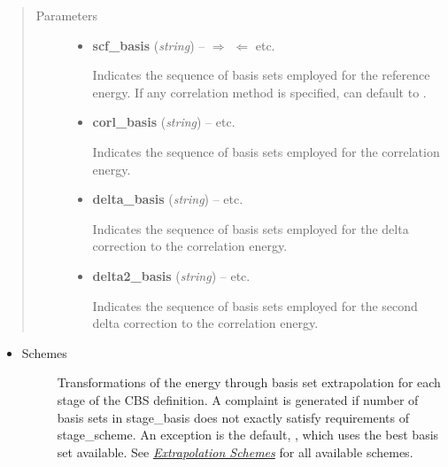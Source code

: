 \documentclass[letterpaper,10pt,english]{sphinxmanual}
\begin{document}
\begin{fulllineitems}
\begin{itemize}
\begin{description}
\end{description}

\end{itemize}
\begin{quote}\begin{description}
\item[{Parameters}] \leavevmode\begin{itemize}
\item {} 
\textbf{scf\_basis} (\emph{string}) -- 
$\Rightarrow$  $\Leftarrow$ \textbar{}\textbar{}  \textbar{}\textbar{}  \textbar{}\textbar{}  \textbar{}\textbar{} etc.

Indicates the sequence of basis sets employed for the reference energy.
If any correlation method is specified,  can default
to .


\item {} 
\textbf{corl\_basis} (\emph{string}) -- 
 \textbar{}\textbar{}  \textbar{}\textbar{}  \textbar{}\textbar{} etc.

Indicates the sequence of basis sets employed for the correlation energy.


\item {} 
\textbf{delta\_basis} (\emph{string}) -- 
 \textbar{}\textbar{}  \textbar{}\textbar{}  \textbar{}\textbar{} etc.

Indicates the sequence of basis sets employed for the delta correction
to the correlation energy.


\item {} 
\textbf{delta2\_basis} (\emph{string}) -- 
 \textbar{}\textbar{}  \textbar{}\textbar{}  \textbar{}\textbar{} etc.

Indicates the sequence of basis sets employed for the second delta correction
to the correlation energy.


\end{itemize}

\end{description}\end{quote}
\begin{itemize}
\item {} \begin{description}
\item[{Schemes}] \leavevmode
Transformations of the energy through basis set extrapolation for each
stage of the CBS definition. A complaint is generated if number of basis
sets in stage\_basis does not exactly satisfy requirements of stage\_scheme.
An exception is the default, , which uses the best basis
set available. See {\hyperref[index:sec-cbs-xtpl]{\emph{Extrapolation Schemes}}} for all available schemes.


\end{description}
\end{itemize}
\end{fulllineitems}
\end{document}

